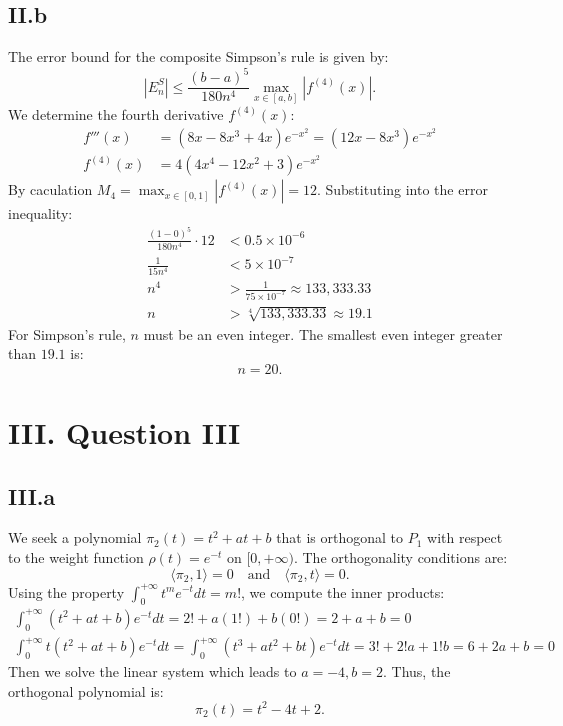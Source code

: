\documentclass[a4paper]{article}
\begin{document}
\subsection*{II.b}
The error bound for the composite Simpson's rule is given by:
\[
|E_n^S| \le \frac{(b-a)^5}{180n^4} \max_{x \in [a, b]} |f^{(4)}(x)|.
\]
We determine the fourth derivative $f^{(4)}(x)$:
\begin{align*}
f'''(x) &= (8x - 8x^3 + 4x)e^{-x^2} = (12x - 8x^3)e^{-x^2} \\
f^{(4)}(x) &= 4(4x^4 - 12x^2 + 3)e^{-x^2}
\end{align*}
By caculation $M_4 = \max_{x \in [0, 1]} |f^{(4)}(x)|=12$.
Substituting into the error inequality:
\begin{align*}
\frac{(1-0)^5}{180n^4} \cdot 12 &< 0.5 \times 10^{-6} \\
\frac{1}{15n^4} &< 5 \times 10^{-7} \\
n^4 &> \frac{1}{75 \times 10^{-7}} \approx 133,333.33 \\
n &> \sqrt[4]{133,333.33} \approx 19.1
\end{align*}
For Simpson's rule, $n$ must be an even integer. The smallest even integer greater than $19.1$ is:
\[
n = 20.
\]


\section*{III. Question III}

\subsection*{III.a}

We seek a polynomial $\pi_2(t) = t^2 + at + b$ that is orthogonal to $P_1$ with respect to the weight function $\rho(t) = e^{-t}$ on $[0, +\infty)$.
The orthogonality conditions are:
\[
\langle \pi_2, 1 \rangle = 0 \quad \text{and} \quad \langle \pi_2, t \rangle = 0.
\]
Using the property $\int_{0}^{+\infty} t^m e^{-t} dt = m!$, we compute the inner products:
\begin{align}
  \int_{0}^{+\infty} (t^2 + at + b) e^{-t} dt = 2! + a(1!) + b(0!) = 2 + a + b = 0\\
  \int_{0}^{+\infty} t(t^2 + at + b) e^{-t} dt = \int_{0}^{+\infty} (t^3 + at^2 + bt) e^{-t} dt = 3! + 2!a + 1!b = 6 + 2a + b = 0
\end{align}
Then we solve the linear system which leads to $a=-4,b=2$.
Thus, the orthogonal polynomial is:
\[
\pi_2(t) = t^2 - 4t + 2.
\]
\end{document}

